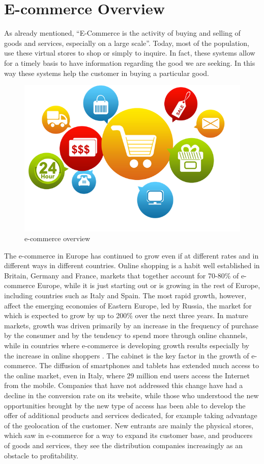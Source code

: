 \section{E-commerce Overview}
\label{sec:e_commerce_overview}
As already mentioned, “E-Commerce is the activity of buying and selling of goods and services, especially on a large scale”. Today, most of the population, use these virtual stores to shop or simply to inquire. In fact, these systems allow for a timely basis to have information regarding the good we are seeking. In this way these systems help the customer in buying a particular good.
\newline
\begin{figure}[htb]
 \centering
 \includegraphics[width=0.8\linewidth]{images/chapter1/e-commerce.png}\hfill
 \caption[e-commerce overview]{e-commerce overview}
 \label{fig:e_commerce_overview}
\end{figure}
The e-commerce in Europe has continued to grow even if at different rates and in different ways in different countries. Online shopping is a habit well established in Britain, Germany and France, markets that together account for 70-80\% of e-commerce Europe, while it is just starting out or is growing in the rest of Europe, including countries such as Italy and Spain. The most rapid growth, however, affect the emerging economies of Eastern Europe, led by Russia, the market for which is expected to grow by up to 200\% over the next three years.
\newline
In mature markets, growth was driven primarily by an increase in the frequency of purchase by the consumer and by the tendency to spend more through online channels, while in countries where e-commerce is developing growth results especially by the increase in online shoppers \cite{e_commerce_in_italy}.
\newline
The cabinet is the key factor in the growth of e-commerce. The diffusion of smartphones and tablets has extended much access to the online market, even in Italy, where 29 million end users access the Internet from the mobile. Companies that have not addressed this change have had a decline in the conversion rate on its website, while those who understood the new opportunities brought by the new type of access has been able to develop the offer of additional products and services dedicated, for example taking advantage of the geolocation of the customer. New entrants are mainly the physical stores, which saw in e-commerce for a way to expand its customer base, and producers of goods and services, they see the distribution companies increasingly as an obstacle to profitability.
